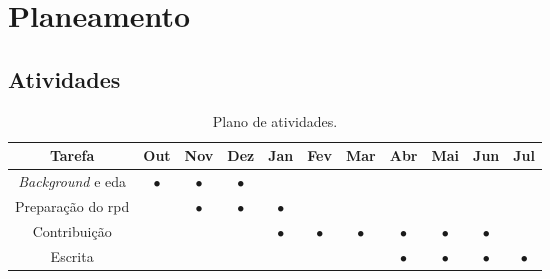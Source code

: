 \chapter{Planeamento}

\section{Atividades}


\begin{table}[H]
\begin{center}
\begin{tabular}{| c | c | c | c | c | c | c | c | c | c | c |}
\hline
\textbf{Tarefa} & \textbf{Out} & \textbf{Nov} & \textbf{Dez} & \textbf{Jan} & \textbf{Fev} & \textbf{Mar} & \textbf{Abr} & \textbf{Mai} & \textbf{Jun} & \textbf{Jul}\\
\hline
\textit{Background} e \acrshort{eda} & $\bullet$ & $\bullet$ & $\bullet$ & & & & & & & \\
\hline
Preparação do \acrshort{rpd} & & $\bullet$ & $\bullet$ & $\bullet$ & & & & & & \\
\hline
Contribuição & & & &$\bullet$ &$\bullet$ &$\bullet$ &$\bullet$ &$\bullet$ &$\bullet$ & \\
\hline
Escrita & & & & & & & $\bullet$ & $\bullet$ & $\bullet$ & $\bullet$ \\
\hline
\end{tabular}
\end{center}
\caption{Plano de atividades.}
\end{table}
